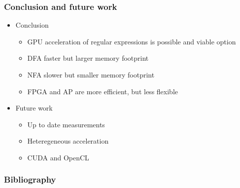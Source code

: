\documentclass{beamer}
\begin{document}
\begin{frame}[fragile=singleslide]\frametitle{Conclusion and future work}
	\begin{itemize}
		\item Conclusion
		      \begin{itemize}
			      \item GPU acceleration of regular expressions is possible and viable option
			      \item DFA faster but larger memory footprint
			      \item NFA slower but smaller memory footprint
			      \item FPGA and AP are more efficient, but less flexible
		      \end{itemize}
		\item Future work
		      \begin{itemize}
			      \item Up to date measurements
			      \item Heteregeneous acceleration
			      \item CUDA and OpenCL
		      \end{itemize}
	\end{itemize}
\end{frame}

\begin{frame}[fragile=singleslide]\frametitle{Bibliography}
	\fontsize{4.5}{1}
	
	
\end{frame}
\end{document}
